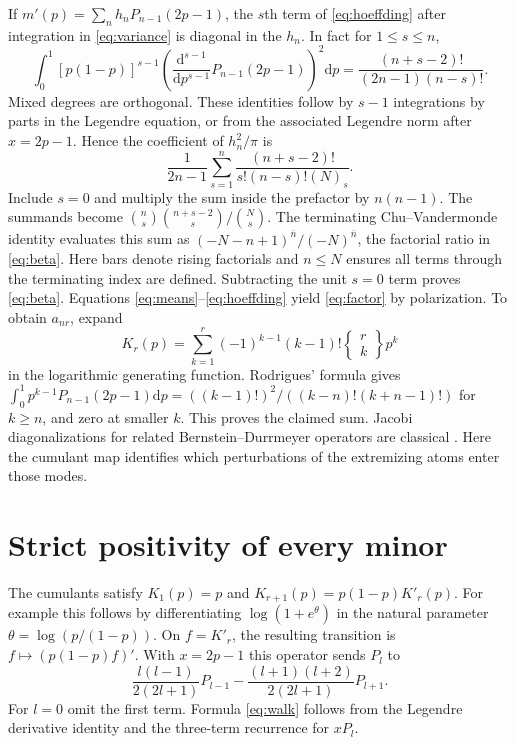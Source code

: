 \documentclass[11pt]{article}
\newcommand{\dd}{\mathrm d}
\begin{document}
If $m'(p)=\sum_{n}h_nP_{n-1}(2p-1)$, the $s$th term of
\eqref{eq:hoeffding} after integration in \eqref{eq:variance}
is diagonal in the $h_n$. In fact for $1\le s\le n$,
\[
 \int_0^1[p(1-p)]^{s-1}
 \left(\frac{\dd^{s-1}}{\dd p^{s-1}}P_{n-1}(2p-1)\right)^2\dd p
 =\frac{(n+s-2)!}{(2n-1)(n-s)!}.
\]
Mixed degrees are orthogonal. These identities follow by
$s-1$ integrations by parts in the Legendre equation, or from the
associated Legendre norm after $x=2p-1$. Hence the coefficient of
$h_n^2/\pi$ is
\[
 \frac1{2n-1}\sum_{s=1}^{n}\frac{(n+s-2)!}{s!(n-s)!(N)_s}.
\]
Include $s=0$ and multiply the sum inside the prefactor by
$n(n-1)$. The summands become
$\binom ns\binom{n+s-2}s/\binom Ns$. The terminating
Chu--Vandermonde identity evaluates this sum as
$(-N-n+1)^{\overline n}/(-N)^{\overline n}$,
the factorial ratio in \eqref{eq:beta}.
Here bars denote rising factorials and $n\le N$ ensures all terms
through the terminating index are defined.
Subtracting the unit $s=0$ term proves \eqref{eq:beta}.
Equations \eqref{eq:means}--\eqref{eq:hoeffding} yield \eqref{eq:factor}
by polarization. To obtain $a_{nr}$, expand
\[
 K_r(p)=\sum_{k=1}^r (-1)^{k-1}(k-1)!
                \left\{\begin{matrix}r\\ k\end{matrix}\right\}p^k
\]
in the logarithmic generating function. Rodrigues' formula gives
$\int_0^1p^{k-1}P_{n-1}(2p-1)\dd p=((k-1)!)^2/((k-n)!(k+n-1)!)$
for $k\ge n$, and zero at smaller $k$. This proves the claimed sum.
Jacobi diagonalizations for related Bernstein--Durrmeyer operators
are classical \cite{waldron}. Here the cumulant map identifies which
perturbations of the extremizing atoms enter those modes.

\section{Strict positivity of every minor}
The cumulants satisfy $K_1(p)=p$ and
$K_{r+1}(p)=p(1-p)K'_r(p)$. For example this follows by
differentiating $\log(1+e^\theta)$ in the natural parameter
$\theta=\log(p/(1-p))$. On $f=K'_r$, the resulting transition is
$f\mapsto (p(1-p)f)'$. With $x=2p-1$ this operator sends $P_l$ to
\begin{equation}\label{eq:walk}
 \frac{l(l-1)}{2(2l+1)}P_{l-1}
 -
 \frac{(l+1)(l+2)}{2(2l+1)}P_{l+1}.
\end{equation}
For $l=0$ omit the first term. Formula \eqref{eq:walk} follows from the
Legendre derivative identity and the three-term recurrence for $xP_l$.
\end{document}
